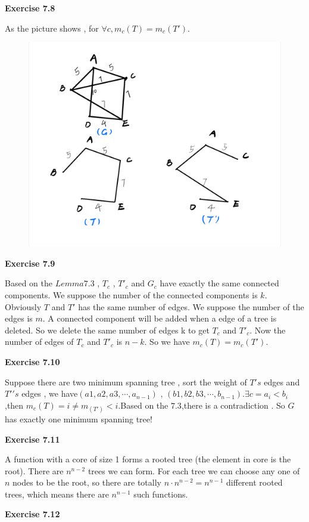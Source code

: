 \documentclass{article} %
\begin{document}
	\textbf{Exercise 7.8}\par
    As the picture shows , for $\forall c,m_c(T)=m_c(T\prime)$.
    \begin{figure}[H]
		\centering
		\includegraphics[scale=0.3]{p3.jpg}
		\caption{}
		\label{fig:2}
	\end{figure}



	\textbf{Exercise 7.9}\par
    Based on the $Lemma 7.3$ , $T_c$ , $T\prime_c$ and $G_c$ have exactly the same connected components. We suppose the number of the connected components is $k$. Obviously $T$ and $T\prime$ has the same number of edges. We suppose the number of the edges is $m$. A connected component will be added when a edge of a tree is deleted. So we delete the same number of edges k to get $T_c$ and $T\prime_c$. Now the number of edges of $T_c$ and $T\prime_c$ is $n-k$. So we have $m_c(T)=m_c(T\prime)$.


	
	\textbf{Exercise 7.10}\par
	Suppose there are two minimum spanning tree , sort the weight of $T's$ edges and $T\prime's$ edges , we have$(a1,a2,a3,\cdots,a_{n-1})$ , $(b1,b2,b3,\cdots,b_{n-1})$.$\exists c = a_i < b_i$,then $m_c(T)=i\ne m_(T\prime)<i$.Based on the $7.3$,there is a contradiction . So $G$ has exactly one minimum spanning tree!

	
	\textbf{Exercise 7.11}\par
	
A function with a core of size 1 forms a rooted tree (the element in core is the root). There are $n^{n-2}$ trees we can form. For each tree we can choose any one of $n$ nodes to be the root, so there are totally $n \cdot n^{n-2}=n^{n-1}$ different rooted trees, which means there are $n^{n-1}$ such functions.\par
	\textbf{Exercise 7.12}\par
\end{document}
